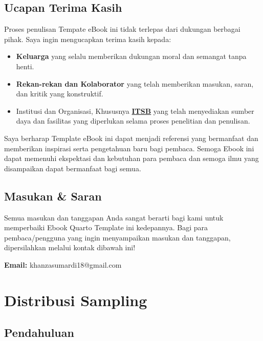 \documentclass[
  indonesian,
  letterpaper,
]{book}
\providecommand{\tightlist}{%
  \setlength{\itemsep}{0pt}\setlength{\parskip}{0pt}}
\begin{document}
\section*{Ucapan Terima Kasih}\label{ucapan-terima-kasih}


Proses penulisan Tempate eBook ini tidak terlepas dari dukungan berbagai
pihak. Saya ingin mengucapkan terima kasih kepada:

\begin{itemize}
\tightlist
\item
  \textbf{Keluarga} yang selalu memberikan dukungan moral dan semangat
  tanpa henti.
\item
  \textbf{Rekan-rekan dan Kolaborator} yang telah memberikan masukan,
  saran, dan kritik yang konstruktif.
\item
  Institusi dan Organisasi, Khususnya
  \textbf{\href{https://itsb.ac.id/}{ITSB}} yang telah menyediakan
  sumber daya dan fasilitas yang diperlukan selama proses penelitian dan
  penulisan.
\end{itemize}

Saya berharap Template eBook ini dapat menjadi referensi yang bermanfaat
dan memberikan inspirasi serta pengetahuan baru bagi pembaca. Semoga
Ebook ini dapat memenuhi ekspektasi dan kebutuhan para pembaca dan
semoga ilmu yang disampaikan dapat bermanfaat bagi semua.

\section*{Masukan \& Saran}\label{masukan-saran}


Semua masukan dan tanggapan Anda sangat berarti bagi kami untuk
memperbaiki Ebook Quarto Template ini kedepannya. Bagi para
pembaca/pengguna yang ingin menyampaikan masukan dan tanggapan,
dipersilahkan melalui kontak dibawah ini!

\textbf{Email:} khanzasumardi18@gmail.com


\chapter{Distribusi Sampling}\label{distribusi-sampling}

\section{Pendahuluan}\label{pendahuluan}
\end{document}
